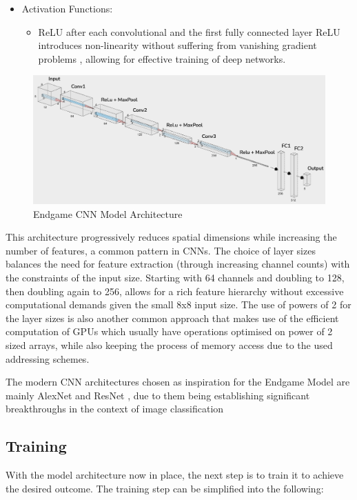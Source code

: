 \begin{itemize}
    \item Activation Functions:
    \begin{itemize}
        \item ReLU after each convolutional and the first fully connected layer
        ReLU introduces non-linearity without suffering from vanishing gradient problems \cite{krizhevskyAlexNet}, allowing for effective training of deep networks.
    \end{itemize}
\end{itemize}

\begin{figure}[H]
    \centering
    \includegraphics[width = \textwidth]{images/CNNArchitectureLabelled.png}
    \caption{Endgame CNN Model Architecture}
    \label{fig: CNNArch}
\end{figure}

This architecture progressively reduces spatial dimensions while increasing the number of features, a common pattern in CNNs. The choice of layer sizes balances the need for feature extraction (through increasing channel counts) with the constraints of the input size. Starting with 64 channels and doubling to 128, then doubling again to 256, allows for a rich feature hierarchy without excessive computational demands given the small 8x8 input size. The use of powers of 2 for the layer sizes is also another common approach that makes use of the efficient computation of GPUs which usually have operations optimised on power of 2 sized arrays, while also keeping the process of memory access due to the used addressing schemes.

The modern CNN architectures chosen as inspiration for the Endgame Model are mainly AlexNet \cite{krizhevskyAlexNet} and ResNet \cite{heResNet}, due to them being establishing significant breakthroughs in the context of image classification \cite{ImageNet}

\subsection{Training}
With the model architecture now in place, the next step is to train it to achieve the desired outcome. The training step can be simplified into the following:

